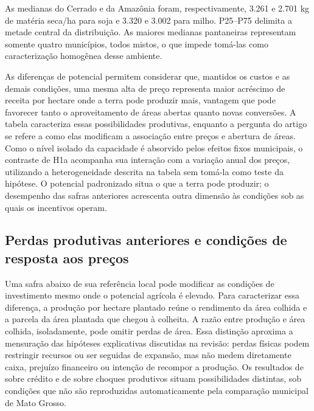 
\FloatBarrier

As medianas do Cerrado e da Amazônia foram, respectivamente, 3.261 e 2.701 kg de matéria seca/ha para soja e 3.320 e 3.002 para milho. P25--P75 delimita a metade central da distribuição. As maiores medianas pantaneiras representam somente quatro municípios, todos mistos, o que impede tomá-las como caracterização homogênea desse ambiente.

As diferenças de potencial permitem considerar que, mantidos os custos e as demais condições, uma mesma alta de preço representa maior acréscimo de receita por hectare onde a terra pode produzir mais, vantagem que pode favorecer tanto o aproveitamento de áreas abertas quanto novas conversões. A tabela caracteriza essas possibilidades produtivas, enquanto a pergunta do artigo se refere a como elas modificam a associação entre preços e abertura de áreas. Como o nível isolado da capacidade é absorvido pelos efeitos fixos municipais, o contraste de H1a acompanha sua interação com a variação anual dos preços, utilizando a heterogeneidade descrita na tabela sem tomá-la como teste da hipótese. O potencial padronizado situa o que a terra pode produzir; o desempenho das safras anteriores acrescenta outra dimensão às condições sob as quais os incentivos operam.

\subsection{Perdas produtivas anteriores e condições de resposta aos preços}
\label{descritiva-perdas}

Uma safra abaixo de sua referência local pode modificar as condições de investimento mesmo onde o potencial agrícola é elevado. Para caracterizar essa diferença, a produção por hectare plantado reúne o rendimento da área colhida e a parcela da área plantada que chegou à colheita. A razão entre produção e área colhida, isoladamente, pode omitir perdas de área. Essa distinção aproxima a mensuração das hipóteses explicativas discutidas na revisão: perdas físicas podem restringir recursos ou ser seguidas de expansão, mas não medem diretamente caixa, prejuízo financeiro ou intenção de recompor a produção. Os resultados de  sobre crédito e de  sobre choques produtivos situam possibilidades distintas, sob condições que não são reproduzidas automaticamente pela comparação municipal de Mato Grosso.

